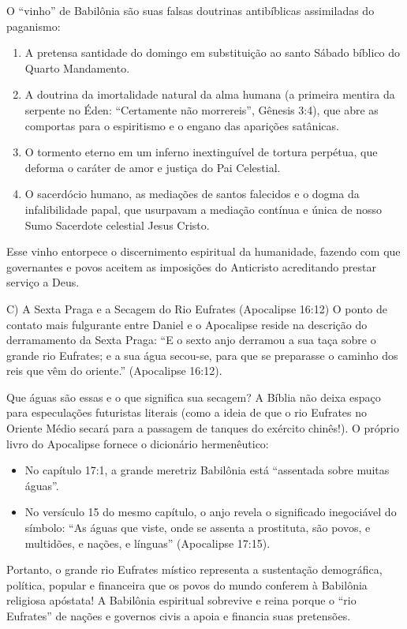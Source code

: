 \documentclass[11pt,a4paper,openany]{book}
\begin{document}
O ``vinho'' de Babilônia são suas falsas doutrinas antibíblicas assimiladas do paganismo:
\begin{enumerate}
  \item A pretensa santidade do domingo em substituição ao santo Sábado bíblico do Quarto Mandamento.
  \item A doutrina da imortalidade natural da alma humana (a primeira mentira da serpente no Éden: ``Certamente não morrereis'', Gênesis 3:4), que abre as comportas para o espiritismo e o engano das aparições satânicas.
  \item O tormento eterno em um inferno inextinguível de tortura perpétua, que deforma o caráter de amor e justiça do Pai Celestial.
  \item O sacerdócio humano, as mediações de santos falecidos e o dogma da infalibilidade papal, que usurpavam a mediação contínua e única de nosso Sumo Sacerdote celestial Jesus Cristo.
\end{enumerate}


Esse vinho entorpece o discernimento espiritual da humanidade, fazendo com que governantes e povos aceitem as imposições do Anticristo acreditando prestar serviço a Deus.

C) A Sexta Praga e a Secagem do Rio Eufrates (Apocalipse 16:12)
O ponto de contato mais fulgurante entre Daniel e o Apocalipse reside na descrição do derramamento da Sexta Praga:
``E o sexto anjo derramou a sua taça sobre o grande rio Eufrates; e a sua água secou-se, para que se preparasse o caminho dos reis que vêm do oriente.'' (Apocalipse 16:12).

Que águas são essas e o que significa sua secagem?
A Bíblia não deixa espaço para especulações futuristas literais (como a ideia de que o rio Eufrates no Oriente Médio secará para a passagem de tanques do exército chinês!). O próprio livro do Apocalipse fornece o dicionário hermenêutico:
\begin{itemize}
  \item No capítulo 17:1, a grande meretriz Babilônia está ``assentada sobre muitas águas''.
  \item No versículo 15 do mesmo capítulo, o anjo revela o significado inegociável do símbolo: ``As águas que viste, onde se assenta a prostituta, são povos, e multidões, e nações, e línguas'' (Apocalipse 17:15).
\end{itemize}


Portanto, o grande rio Eufrates místico representa a sustentação demográfica, política, popular e financeira que os povos do mundo conferem à Babilônia religiosa apóstata! A Babilônia espiritual sobrevive e reina porque o ``rio Eufrates'' de nações e governos civis a apoia e financia suas pretensões.
\end{document}
